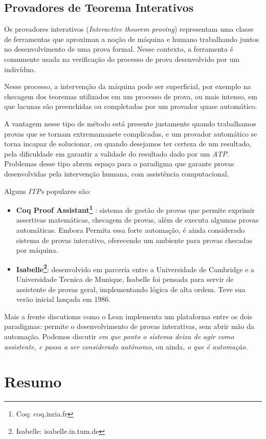 \subsection{Provadores de Teorema Interativos}

Os provadores interativos (\textit{Interactive theorem proving}) representam uma classe de ferramentas que aproximan a noção de máquina e humano trabalhando juntos no desenvolvimento de uma prova formal.
Nesse contexto, a ferramenta é comumente usada na verificação do processo de prova desenvolvido por um indivíduo.

Nesse processo, a intervenção da máquina pode ser superficial, por exemplo na checagem dos teoremas utilizados em um processo de prova, ou mais intenso, em que lacunas são preenchidas ou completadas por um provador quase automático.

A vantagem nesse tipo de método está presente justamente quando trabalhamos provas que se tornam extremamanete complicadas, e um provador automático se torna incapaz de solucionar, ou quando desejamos ter certeza de um resultado, pela dificuldade em garantir a validade do resultado dado por um \textit{ATP}.
Problemas desse tipo abrem espaço para o paradigma que garante provas desenvolvidas pela intervenção humana, com assistência computacional.

Alguns \textit{ITPs} populares são:
\begin{itemize}
    \item \textbf{Coq Proof Assistant\footnote{Coq: coq.inria.fr}} : sistema de gestão de provas que permite exprimir assertivas matemáticas, checagem de provas, além de executa algumas provas automáticas. Embora Permita essa forte automação, é ainda considerado sistema de provas interativo, oferecendo um ambiente para provas checadas por máquina.

    \item \textbf{Isabelle\footnote{Isabelle: isabelle.in.tum.de}}: desenvolvido em parceria entre a Universidade de Cambridge e a Universidade Tecnica de Munique, Isabelle foi pensada para servir de assistente de provas geral, implementando lógica de alta ordem. Teve sua verão inicial lançada em 1986.
\end{itemize}

Mais a frente discutioms como o Lean implementa um plataforma entre os dois paradigmas: permite o desenvolvimento de provas interativas, sem abrir mão da automação.
Podemos discutir \textit{em que ponto o sistema deixa de agir como assistente, e passa a ser considerado autônomo}, ou ainda, \textit{o que é automação}.


\section{Resumo}
